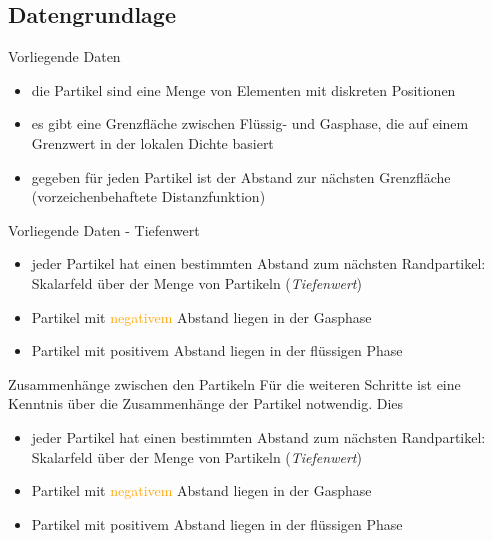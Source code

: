 \documentclass[10pt]{beamer}
\newcommand{\liquid}[1]{\textcolor{blau}{#1}}
\newcommand{\wichtig}[1]{\textit{#1}}
\newcommand{\gas}[1]{\textcolor{orange}{#1}}
\begin{document}
\subsection{Datengrundlage}
\begin{frame}{Vorliegende Daten}
	\begin{itemize}
		\item die Partikel sind eine Menge von Elementen mit diskreten Positionen
		\item es gibt eine Grenzfläche zwischen Flüssig- und Gasphase, die auf einem Grenzwert in der lokalen Dichte basiert
		\item gegeben für jeden Partikel ist der Abstand zur nächsten Grenzfläche (vorzeichenbehaftete Distanzfunktion)
	\end{itemize}
\end{frame}

\begin{frame}{Vorliegende Daten - Tiefenwert}
	\begin{itemize}
		\item jeder Partikel hat einen bestimmten Abstand zum nächsten Randpartikel: Skalarfeld über der Menge von Partikeln (\wichtig{Tiefenwert})
		\item Partikel mit \gas{negativem} Abstand liegen in der Gasphase
		\item Partikel mit \liquid{positivem} Abstand liegen in der flüssigen Phase 
	\end{itemize}
\end{frame}

\begin{frame}{Zusammenhänge zwischen den Partikeln}
	Für die weiteren Schritte ist eine Kenntnis über die Zusammenhänge der Partikel notwendig. Dies 
	\begin{itemize}
		\item jeder Partikel hat einen bestimmten Abstand zum nächsten Randpartikel: Skalarfeld über der Menge von Partikeln (\wichtig{Tiefenwert})
		\item Partikel mit \gas{negativem} Abstand liegen in der Gasphase
		\item Partikel mit \liquid{positivem} Abstand liegen in der flüssigen Phase 
	\end{itemize}
\end{frame}
\end{document}

